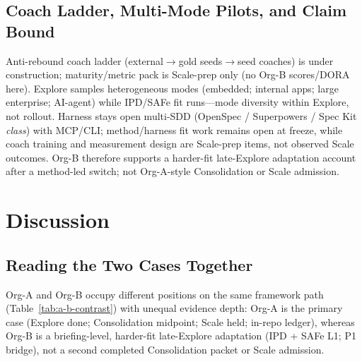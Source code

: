 \documentclass[10pt,conference]{IEEEtran}
\begin{document}
\subsection{Coach Ladder, Multi-Mode Pilots, and Claim Bound}

Anti-rebound coach ladder (external$\rightarrow$gold seeds$\rightarrow$seed
coaches) is under construction; maturity/metric pack is Scale-prep only (no
Org-B scores/DORA here).
Explore samples heterogeneous modes (embedded; internal apps; large enterprise;
AI-agent) while IPD/SAFe fit runs---mode diversity within Explore, not rollout.
Harness stays open multi-SDD (OpenSpec / Superpowers / Spec Kit \emph{class})
with MCP/CLI; method/harness fit work remains open at freeze, while coach
training and measurement design are Scale-prep items, not observed Scale
outcomes.
Org-B therefore supports a harder-fit late-Explore adaptation account after a
method-led switch; not Org-A-style Consolidation or Scale admission.

\section{Discussion}
\label{sec:discussion}

\subsection{Reading the Two Cases Together}

Org-A and Org-B occupy different positions on the same framework path
(Table~\ref{tab:a-b-contrast}) with unequal evidence depth: Org-A is the
primary case (Explore done; Consolidation midpoint; Scale held; in-repo
ledger), whereas Org-B is a briefing-level, harder-fit late-Explore
adaptation (IPD + SAFe L1; P1 bridge), not a second completed Consolidation
packet or Scale admission.
\end{document}

